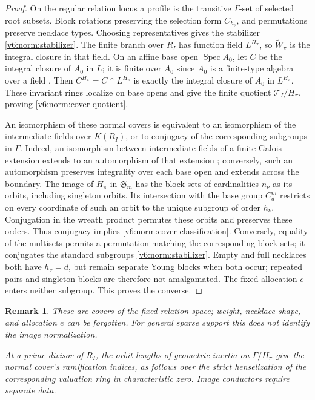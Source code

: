 \documentclass[10pt,fleqn]{article}
\numberwithin{equation}{section}
\newtheorem{remark}[theorem]{Remark}
\begin{document}
\begin{proof}
On the regular relation locus a profile is the transitive
$\Gamma$-set of selected root subsets.  Block rotations preserving the selection form $C_{h_\nu}$, and
permutations preserve necklace types.  Choosing representatives gives
the stabilizer \eqref{v6:norm:stabilizer}.  The finite branch over $R_I$ has function field $L^{H_\pi}$, so
$\widetilde W_\pi$ is the integral closure in that field.  On an affine base open $\operatorname{Spec}A_0$, let
$C$ be the integral closure of $A_0$ in $L$; it is finite over $A_0$
since $A_0$ is a finite-type algebra over a field
\cite[Tag 0335]{Stacks}.  Then $C^{H_\pi}=C\cap L^{H_\pi}$ is exactly
the integral closure of $A_0$ in $L^{H_\pi}$.  These invariant rings
localize on base opens and give the finite quotient
$\mathcal T_I/H_\pi$, proving \eqref{v6:norm:cover-quotient}.

An isomorphism of these normal covers is equivalent to an isomorphism
of the intermediate fields over $K(R_I)$, or to conjugacy of the
corresponding subgroups in $\Gamma$.  Indeed, an isomorphism between
intermediate fields of a finite Galois extension extends to an
automorphism of that extension \cite[Tag 0BME]{Stacks}; conversely,
such an automorphism preserves integrality over each base open and
extends across the boundary.  The image of $H_\pi$ in
$\mathfrak S_m$ has the block sets of cardinalities $n_\nu$ as its
orbits, including singleton orbits.  Its intersection with the base
group $C_d^m$ restricts on every coordinate of such an orbit to the
unique subgroup of order $h_\nu$.  Conjugation in the wreath product
permutes these orbits and preserves these orders.  Thus conjugacy
implies \eqref{v6:norm:cover-classification}.  Conversely, equality
of the multisets permits a permutation matching the corresponding
block sets; it conjugates the standard subgroups
\eqref{v6:norm:stabilizer}.  Empty and full necklaces both have
$h_\nu=d$, but remain separate Young blocks when both occur;
repeated pairs and singleton blocks are therefore not amalgamated.
The fixed allocation $e$ enters neither subgroup.  This proves the converse.
\end{proof}

\begin{remark}\label{v6:norm:cover-scope}
These are covers of the fixed relation space; weight, necklace
shape, and allocation $e$ can be forgotten.  For general sparse
support this does not identify the image normalization.

At a prime divisor of $R_I$, the orbit lengths of geometric inertia
on $\Gamma/H_\pi$ give the normal cover's ramification indices,
as follows over the strict henselization of the corresponding valuation
ring in characteristic zero.  Image conductors require separate data.
\end{remark}
\end{document}
